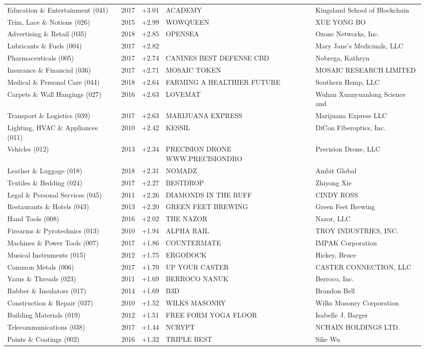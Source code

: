 \begin{tabular}{>{\raggedright\arraybackslash}p{4.0cm}rr>{\raggedright\arraybackslash}p{4.5cm}>{\raggedright\arraybackslash}p{4.5cm}}
Education \& Entertainment (041) & 2017 & +3.01 & ACADEMY & Kingsland School of Blockchain \\
Trim, Lace \& Notions (026) & 2015 & +2.99 & WOWQUEEN & XUE YONG BO \\
Advertising \& Retail (035) & 2018 & +2.85 & OPENSEA & Ozone Networks, Inc. \\
Lubricants \& Fuels (004) & 2017 & +2.82 &  & Mary Jane's Medicinals, LLC \\
Pharmaceuticals (005) & 2017 & +2.74 & CANINES BEST DEFENSE CBD & Nobrega, Kathryn \\
Insurance \& Financial (036) & 2017 & +2.71 & MOSAIC TOKEN & MOSAIC RESEARCH LIMITED \\
Medical \& Personal Care (044) & 2018 & +2.64 & FARMING A HEALTHIER FUTURE & Southern Hemp, LLC \\
Carpets \& Wall Hangings (027) & 2016 & +2.63 & LOVEMAT & Wuhan Xuanyuanlong Science and \\
Transport \& Logistics (039) & 2017 & +2.63 & MARIJUANA EXPRESS & Marijuana Express LLC \\
Lighting, HVAC \& Appliances (011) & 2010 & +2.42 & KESSIL & DiCon Fiberoptics, Inc. \\
Vehicles (012) & 2013 & +2.34 & PRECISION DRONE WWW.PRECISIONDRO & Precision Drone, LLC \\
Leather \& Luggage (018) & 2018 & +2.31 & NOMADZ & Ambit Global \\
Textiles \& Bedding (024) & 2017 & +2.27 & BESTDROP & Zhiyong Xie \\
Legal \& Personal Services (045) & 2011 & +2.26 & DIAMONDS IN THE RUFF & CINDY ROSS \\
Restaurants \& Hotels (043) & 2013 & +2.20 & GREEN FEET BREWING & Green Feet Brewing \\
Hand Tools (008) & 2016 & +2.02 & THE NAZOR & Nazor, LLC \\
Firearms \& Pyrotechnics (013) & 2010 & +1.94 & ALPHA RAIL & TROY INDUSTRIES, INC. \\
Machines \& Power Tools (007) & 2017 & +1.86 & COUNTERMATE & IMPAK Corporation \\
Musical Instruments (015) & 2012 & +1.75 & ERGODOCK & Hickey, Bruce \\
Common Metals (006) & 2017 & +1.70 & UP YOUR CASTER & CASTER CONNECTION, LLC \\
Yarns \& Threads (023) & 2011 & +1.69 & BERROCO NANUK & Berroco, Inc. \\
Rubber \& Insulators (017) & 2014 & +1.69 & B3D & Brandon Bell \\
Construction \& Repair (037) & 2010 & +1.52 & WILKS MASONRY & Wilks Masonry Corporation \\
Building Materials (019) & 2012 & +1.51 & FREE FORM YOGA FLOOR & Isabelle J. Barger \\
Telecommunications (038) & 2017 & +1.44 & NCRYPT & NCHAIN HOLDINGS LTD. \\
Paints \& Coatings (002) & 2016 & +1.32 & TRIPLE BEST & Sike Wu \\
\bottomrule
\end{tabular}
